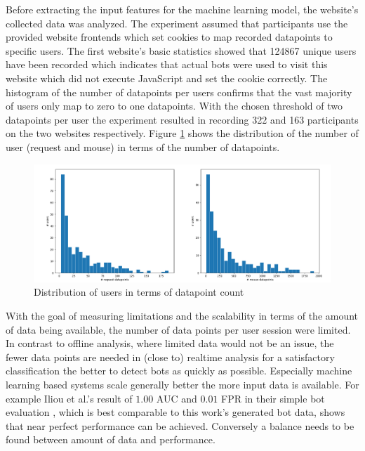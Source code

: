 \documentclass[
    fontsize=12pt,
    headings=small,
    parskip=half,           %
    bibliography=totoc,
    numbers=noenddot,       %
    open=any,               %
    final,                   %
    table
]{scrreprt}
\begin{document}
Before extracting the input features for the machine learning model, the website's collected data was analyzed. The experiment assumed that participants use the provided website frontends which set cookies to map recorded datapoints to specific users. The first website's basic statistics showed that 124867 unique users have been recorded which indicates that actual bots were used to visit this website which did not execute JavaScript and set the cookie correctly. The histogram of the number of datapoints per users confirms that the vast majority of users only map to zero to one datapoints. With the chosen threshold of two datapoints per user the experiment resulted in recording 322 and 163 participants on the two websites respectively. Figure \ref{fig:user_dp_hist} shows the distribution of the number of user (request and mouse) in terms of the number of datapoints.

\begin{figure}[h]
    \includegraphics[width=\textwidth]{figures/user_dp_hist.png}
    \caption{Distribution of users in terms of datapoint count}
    \label{fig:user_dp_hist}
\end{figure}



With the goal of measuring limitations and the scalability in terms of the amount of data being available, the number of data points per user session were limited. In contrast to offline analysis, where limited data would not be an issue, the fewer data points are needed in (close to) realtime analysis for a satisfactory classification the better to detect bots as quickly as possible. Especially machine learning based systems scale generally better the more input data is available. For example Iliou et al.'s result of $1.00$ AUC and $0.01$ FPR in their simple bot evaluation \cite{10.1145/3339252.3339267}, which is best comparable to this work's generated bot data, shows that near perfect performance can be achieved. Conversely a balance needs to be found between amount of data and performance.
\end{document}
